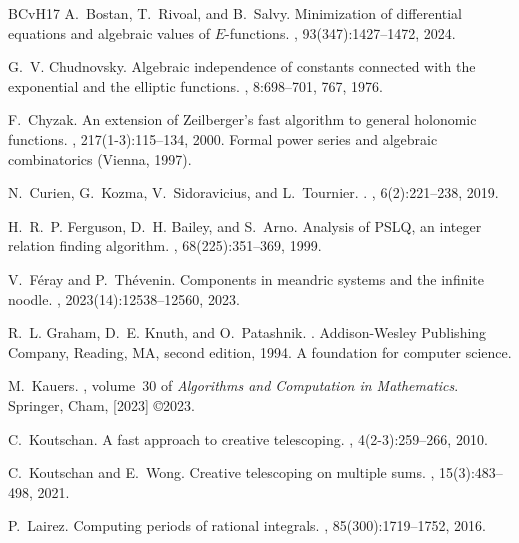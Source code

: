 \documentclass[12pt]{amsart}
\theoremstyle{plain}
\theoremstyle{remark}
\begin{document}
\begin{thebibliography}{BCvH{\etalchar{+}}17}
A.~Bostan, T.~Rivoal, and B.~Salvy.
\newblock Minimization of differential equations and algebraic values of
  {$E$}-functions.
, 93(347):1427--1472, 2024.

G.~V. Chudnovsky.
\newblock Algebraic independence of constants connected with the exponential
  and the elliptic functions.
, 8:698--701, 767, 1976.

F.~Chyzak.
\newblock An extension of {Z}eilberger's fast algorithm to general holonomic
  functions.
, 217(1-3):115--134, 2000.
\newblock Formal power series and algebraic combinatorics (Vienna, 1997).

N.~{Curien}, G.~{Kozma}, V.~{Sidoravicius}, and L.~{Tournier}.
.
,
  6(2):221--238, 2019.

H.~R.~P. Ferguson, D.~H. Bailey, and S.~Arno.
\newblock Analysis of {PSLQ}, an integer relation finding algorithm.
, 68(225):351--369, 1999.

V.~F{\'e}ray and P.~Th{\'e}venin.
\newblock Components in meandric systems and the infinite noodle.
, 2023(14):12538--12560, 2023.

R.~L. Graham, D.~E. Knuth, and O.~Patashnik.
.
\newblock Addison-Wesley Publishing Company, Reading, MA, second edition, 1994.
\newblock A foundation for computer science.

M.~Kauers.
, volume~30 of {\em Algorithms and
  Computation in Mathematics}.
\newblock Springer, Cham, [2023] \copyright 2023.

C.~Koutschan.
\newblock A fast approach to creative telescoping.
, 4(2-3):259--266, 2010.

C.~Koutschan and E.~Wong.
\newblock Creative telescoping on multiple sums.
, 15(3):483--498, 2021.

P.~Lairez.
\newblock Computing periods of rational integrals.
, 85(300):1719--1752, 2016.


\end{thebibliography}
\end{document}
